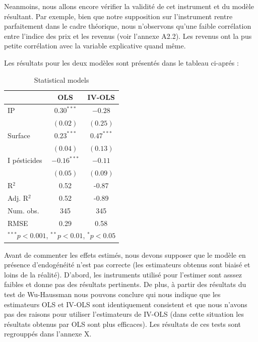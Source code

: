 \documentclass[11pt,]{article}
\begin{document}
Neanmoins, nous allons encore vérifier la validité de cet instrument et
du modèle résultant. Par exemple, bien que notre supposition sur
l'instrument rentre parfaitement dans le cadre théorique, nous
n'observons qu'une faible corrélation entre l'indice des prix et les
revenus (voir l'annexe A2.2). Les revenus ont la pus petite corrélation
avec la variable explicative quand même.

Les résultats pour les deux modèles sont présentés dans le tableau
ci-aprés :

\FloatBarrier

\begin{table}[!htbp]
\begin{center}
\begin{tabular}{l c c }
\hline
 & OLS & IV-OLS \\
\hline
IP           & $0.30^{***}$  & $-0.28$      \\
             & $(0.02)$      & $(0.25)$     \\
Surface      & $0.23^{***}$  & $0.47^{***}$ \\
             & $(0.04)$      & $(0.13)$     \\
I pésticides & $-0.16^{***}$ & $-0.11$      \\
             & $(0.05)$      & $(0.09)$     \\
\hline
R$^2$        & 0.52          & -0.87        \\
Adj. R$^2$   & 0.52          & -0.89        \\
Num. obs.    & 345           & 345          \\
RMSE         & 0.29          & 0.58         \\
\hline
\multicolumn{3}{l}{\scriptsize{$^{***}p<0.001$, $^{**}p<0.01$, $^*p<0.05$}}
\end{tabular}
\caption{Statistical models}
\label{table : ols et ivols}
\end{center}
\end{table}

\FloatBarrier

Avant de commenter les effets estimés, nous devons supposer que le
modèle en présence d'endogénéité n'est pas correcte (les estimateurs
obtenus sont biaisé et loins de la réalité). D'abord, les instruments
utilisé pour l'estimer sont asssez faibles et donne pas des résultats
pertinents. De plus, à partir des résultats du test de Wu-Haussman nous
pouvons conclure qui nous indique que les estimateurs OLS et IV-OLS sont
identiquement consistent et que nous n'avons pas des raisons pour
utiliser l'estimateurs de IV-OLS (dans cette situation les résultats
obtenus par OLS sont plus efficaces). Les résultats de ces tests sont
regrouppés dans l'annexe X.
\end{document}
